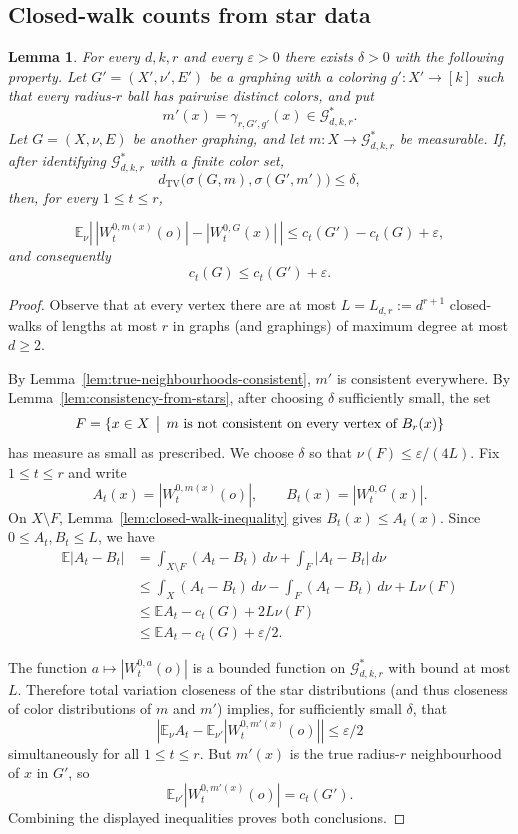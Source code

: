 \documentclass[11pt]{amsart}
\newcommand{\E}{\mathbb E}
\newcommand{\calG}{\mathcal G}
\newcommand{\TV}{\operatorname{TV}}
\newtheorem{lemma}[theorem]{Lemma}
\theoremstyle{remark}
\begin{document}
\subsection{Closed-walk counts from star data}

\begin{lemma}\label{lem:closed-walk-stability}
For every $d,k,r$ and every $\varepsilon>0$ there exists $\delta>0$ with the following property.  Let $G'=(X',\nu',E')$ be a graphing with a coloring $g'\colon X'\to[k]$ such that every radius-$r$ ball has pairwise distinct colors, and put
\[
 m'(x)=\gamma_{r,G',g'}(x)\in\calG^*_{d,k,r}.
\]
Let $G=(X,\nu,E)$ be another graphing, and let $m\colon X\to\calG^*_{d,k,r}$ be measurable.  If, after identifying $\calG^*_{d,k,r}$ with a finite color set,
\[
 d_{\TV}\bigl(\sigma(G,m),\sigma(G',m')\bigr)\leq\delta,
\]
then, for every $1\leq t\leq r$,

\[
 \E_\nu\left|\,|W_t^{0,m(x)}(o)|-|W_t^{0,G}(x)|\,\right|
 \leq c_t(G')-c_t(G)+\varepsilon,
\]
and consequently
\[
 c_t(G)\leq c_t(G')+\varepsilon.
\]
\end{lemma}

\begin{proof} Observe that at every vertex there are at most $L=L_{d,r}:=d^{r+1}$ closed-walks of lengths at most $r$ in graphs (and graphings) of maximum degree at most $d\geq 2$. 

By Lemma~\ref{lem:true-neighbourhoods-consistent}, $m'$ is consistent everywhere.  By Lemma~\ref{lem:consistency-from-stars}, after choosing $\delta$ sufficiently small, the set
\[
 F=\{x\in X\,\bigm|\, m\text{ is not consistent on every vertex of }B_r(x)\}
\]
has measure as small as prescribed.  We choose $\delta$ so that $\nu(F)\leq \varepsilon/(4L)$.
Fix $1\leq t\leq r$ and write
\[
 A_t(x)=|W_t^{0,m(x)}(o)|,\qquad B_t(x)=|W_t^{0,G}(x)|.
\]
On $X\setminus F$, Lemma~\ref{lem:closed-walk-inequality} gives $B_t(x)\leq A_t(x)$.  Since $0\leq A_t,B_t\leq L$, we have
\[
 \begin{aligned}
 \E|A_t-B_t|
 &=\int_{X\setminus F}(A_t-B_t)\,d\nu+\int_F |A_t-B_t|\,d\nu\\
 &\leq \int_X(A_t-B_t)\,d\nu-\int_F(A_t-B_t)\,d\nu+L\nu(F)\\
 &\leq \E A_t-c_t(G)+2L\nu(F)\\
 &\leq \E A_t-c_t(G)+\varepsilon/2 .
 \end{aligned}
\]

The function $a\mapsto |W_t^{0,a}(o)|$ is a bounded function on $\calG^*_{d,k,r}$ with bound at most $L$. Therefore total variation closeness of the star distributions (and thus closeness of color distributions of $m$ and $m'$) implies, for sufficiently small $\delta$, that
\[
 \left|\E_\nu A_t-\E_{\nu'} |W_t^{0,m'(x)}(o)|\right|\leq\varepsilon/2
\]
simultaneously for all $1\leq t\leq r$.  But $m'(x)$ is the true radius-$r$ neighbourhood of $x$ in $G'$, so
\[
 \E_{\nu'} |W_t^{0,m'(x)}(o)|=c_t(G').
\]
Combining the displayed inequalities proves both conclusions.
\end{proof}
\end{document}
